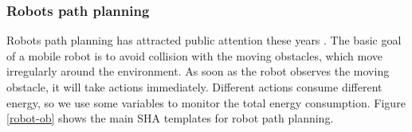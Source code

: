 \subsubsection{Robots path planning}
Robots path planning has attracted public attention these years \cite{LWAB10}. The basic goal of a mobile robot is to avoid collision with the moving obstacles, which move irregularly around the environment. As soon as the robot observes the moving obstacle, it will take actions immediately. Different actions consume different energy, so we use some variables to monitor the total energy consumption. Figure \ref{robot-ob} shows the main SHA templates for robot path planning.
\begin{figure}[htbp]
\end{figure}


